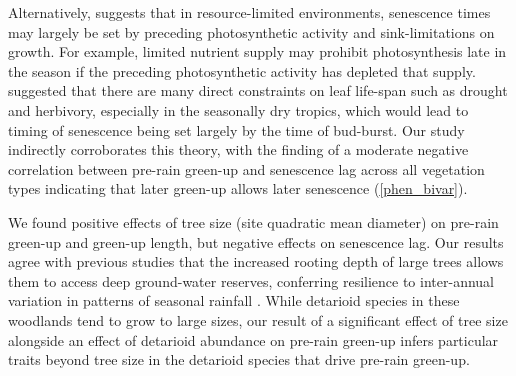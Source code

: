 \documentclass[11pt,a4paper]{article}
\begin{document}
Alternatively, \citet{Zani2020} suggests that in resource-limited environments,
senescence times may largely be set by preceding photosynthetic activity and
sink-limitations on growth. For example, limited nutrient supply may prohibit
photosynthesis late in the season if the preceding photosynthetic activity has
depleted that supply. \citet{Reich1992} suggested that there are many direct
constraints on leaf life-span such as drought and herbivory, especially in the
seasonally dry tropics, which would lead to timing of senescence being set
largely by the time of bud-burst. Our study indirectly corroborates this
theory, with the finding of a moderate negative correlation between pre-rain
green-up and senescence lag across all vegetation types indicating that later
green-up allows later senescence (\autoref{phen_bivar}).

We found positive effects of tree size (site quadratic mean diameter) on
pre-rain green-up and green-up length, but negative effects on senescence lag.
Our results agree with previous studies that the increased rooting depth of
large trees allows them to access deep ground-water reserves, conferring
resilience to inter-annual variation in patterns of seasonal rainfall
\citep{Holdo2017}. While detarioid species in these woodlands tend to grow to
large sizes, our result of a significant effect of tree size alongside an
effect of detarioid abundance on pre-rain green-up infers particular traits
beyond tree size in the detarioid species that drive pre-rain green-up.
\end{document}
